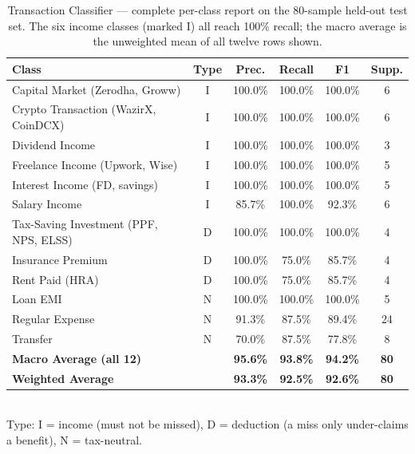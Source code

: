 \documentclass[12pt, a4paper, oneside]{report}
\begin{document}
\begin{table}[H]
\centering
\caption{Transaction Classifier --- complete per-class report on the 80-sample held-out test set. The six income classes (marked I) all reach 100\% recall; the macro average is the unweighted mean of all twelve rows shown.}
\label{tab:classifier}
\small
\begin{tabularx}{\textwidth}{|X|c|c|c|c|c|}
\hline
\textbf{Class} & \textbf{Type} & \textbf{Prec.} & \textbf{Recall} & \textbf{F1} & \textbf{Supp.} \\
\hline
Capital Market (Zerodha, Groww)        & I & 100.0\% & 100.0\% & 100.0\% & 6 \\
\hline
Crypto Transaction (WazirX, CoinDCX)   & I & 100.0\% & 100.0\% & 100.0\% & 6 \\
\hline
Dividend Income                        & I & 100.0\% & 100.0\% & 100.0\% & 3 \\
\hline
Freelance Income (Upwork, Wise)        & I & 100.0\% & 100.0\% & 100.0\% & 5 \\
\hline
Interest Income (FD, savings)          & I & 100.0\% & 100.0\% & 100.0\% & 5 \\
\hline
Salary Income                          & I & 85.7\%  & 100.0\% & 92.3\%  & 6 \\
\hline
Tax-Saving Investment (PPF, NPS, ELSS) & D & 100.0\% & 100.0\% & 100.0\% & 4 \\
\hline
Insurance Premium                      & D & 100.0\% & 75.0\%  & 85.7\%  & 4 \\
\hline
Rent Paid (HRA)                        & D & 100.0\% & 75.0\%  & 85.7\%  & 4 \\
\hline
Loan EMI                               & N & 100.0\% & 100.0\% & 100.0\% & 5 \\
\hline
Regular Expense                        & N & 91.3\%  & 87.5\%  & 89.4\%  & 24 \\
\hline
Transfer                               & N & 70.0\%  & 87.5\%  & 77.8\%  & 8 \\
\hline
\textbf{Macro Average (all 12)}        &   & \textbf{95.6\%} & \textbf{93.8\%} & \textbf{94.2\%} & \textbf{80} \\
\hline
\textbf{Weighted Average}              &   & \textbf{93.3\%} & \textbf{92.5\%} & \textbf{92.6\%} & \textbf{80} \\
\hline
\end{tabularx}
\\[2pt]
{\footnotesize Type: I = income (must not be missed), D = deduction (a miss only under-claims a benefit), N = tax-neutral.}
\end{table}
\end{document}
